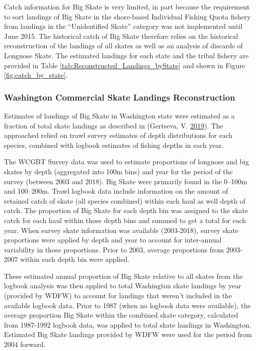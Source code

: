 \documentclass[12pt,]{article}
\begin{document}
Catch information for Big Skate is very limited, in part because the
requirement to sort landings of Big Skate in the shore-based Individual
Fishing Quota fishery from landings in the ``Unidentified Skate''
category was not implemented until June 2015. The historical catch of
Big Skate therefore relies on the historical reconstruction of the
landings of all skates as well as an analysis of discards of Longnose
Skate. The estimated landings for each state and the tribal fishery are
provided in Table \ref{tab:Reconstructed_Landings_byState} and shown in
Figure \ref{fig:catch_by_state}.

\hypertarget{washington-commercial-skate-landings-reconstruction}{%
\subsubsection{Washington Commercial Skate Landings
Reconstruction}\label{washington-commercial-skate-landings-reconstruction}}

Estimates of landings of Big Skate in Washington state were estimated as
a fraction of total skate landings as described in (Gertseva, V.
\protect\hyperlink{ref-Gertseva2019}{2019}). The approached relied on
trawl survey estimates of depth distributions for each species, combined
with logbook estimates of fishing depths in each year.

The WCGBT Survey data was used to estimate proportions of longnose and
big skates by depth (aggregated into 100m bins) and year for the period
of the survey (between 2003 and 2018). Big Skate were primarily found in
the 0--100m and 100--200m. Trawl logbook data include information on the
amount of retained catch of skate (all species combined) within each
haul as well depth of catch. The proportion of Big Skate for each depth
bin was assigned to the skate catch for each haul within those depth
bins and summed to get a total for each year. When survey skate
information was available (2003-2018), survey skate proportions were
applied by depth and year to account for inter-annual variability in
those proportions. Prior to 2003, average proportions from 2003-2007
within each depth bin were applied.

These estimated annual proportion of Big Skate relative to all skates
from the logbook analysis was then applied to total Washington skate
landings by year (provided by WDFW) to account for landings that weren't
included in the available logbook data. Prior to 1987 (when no logbook
data were available), the average proportion Big Skate within the
combined skate category, calculated from 1987-1992 logbook data, was
applied to total skate landings in Washington. Estimated Big Skate
landings provided by WDFW were used for the period from 2004 forward.
\end{document}
